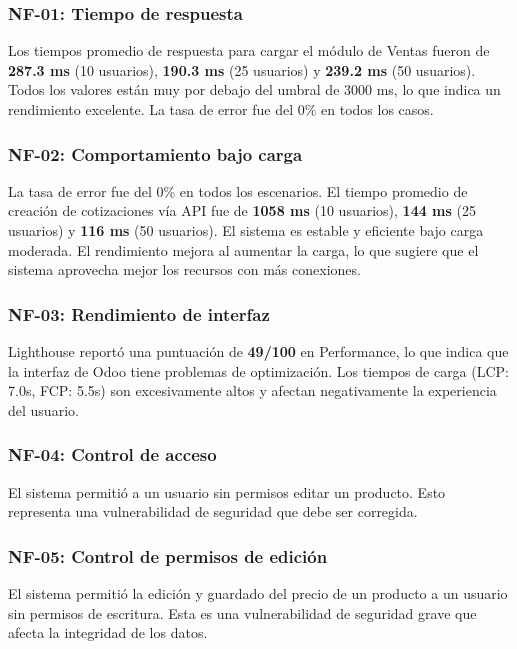 \documentclass[12pt, letterpaper]{article}
\begin{document}
\subsubsection{NF-01: Tiempo de respuesta}

Los tiempos promedio de respuesta para cargar el módulo de Ventas fueron de \textbf{287.3 ms} (10 usuarios), \textbf{190.3 ms} (25 usuarios) y \textbf{239.2 ms} (50 usuarios). Todos los valores están muy por debajo del umbral de 3000 ms, lo que indica un rendimiento excelente. La tasa de error fue del 0\% en todos los casos.

\subsubsection{NF-02: Comportamiento bajo carga}

La tasa de error fue del 0\% en todos los escenarios. El tiempo promedio de creación de cotizaciones vía API fue de \textbf{1058 ms} (10 usuarios), \textbf{144 ms} (25 usuarios) y \textbf{116 ms} (50 usuarios). El sistema es estable y eficiente bajo carga moderada. El rendimiento mejora al aumentar la carga, lo que sugiere que el sistema aprovecha mejor los recursos con más conexiones.

\subsubsection{NF-03: Rendimiento de interfaz}

Lighthouse reportó una puntuación de \textbf{49/100} en Performance, lo que indica que la interfaz de Odoo tiene problemas de optimización. Los tiempos de carga (LCP: 7.0s, FCP: 5.5s) son excesivamente altos y afectan negativamente la experiencia del usuario.

\subsubsection{NF-04: Control de acceso}

El sistema permitió a un usuario sin permisos editar un producto. Esto representa una vulnerabilidad de seguridad que debe ser corregida.

\subsubsection{NF-05: Control de permisos de edición}

El sistema permitió la edición y guardado del precio de un producto a un usuario sin permisos de escritura. Esta es una vulnerabilidad de seguridad grave que afecta la integridad de los datos.
\end{document}
